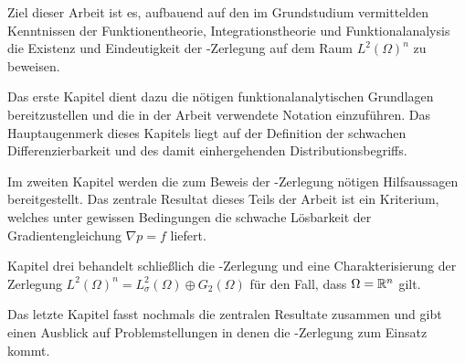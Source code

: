 Ziel dieser Arbeit ist es, aufbauend auf den im Grundstudium vermittelden Kenntnissen der Funktionentheorie, Integrationstheorie und Funktionalanalysis die Existenz und Eindeutigkeit der \helmholtz\hyp{}Zerlegung auf dem Raum $L^2(\Omega)^n$ zu beweisen.

Das erste Kapitel dient dazu die nötigen funktionalanalytischen Grundlagen bereitzustellen und die in der Arbeit verwendete Notation einzuführen.
Das Hauptaugenmerk dieses Kapitels liegt auf der Definition der schwachen Differenzierbarkeit und des damit einhergehenden Distributionsbegriffs.

Im zweiten Kapitel werden die zum Beweis der \helmholtz\hyp{}Zerlegung nötigen Hilfsaussagen bereitgestellt.
Das zentrale Resultat dieses Teils der Arbeit ist ein Kriterium, welches unter gewissen Bedingungen die schwache Lösbarkeit der Gradientengleichung $\nabla p = f$ liefert.

Kapitel drei behandelt schließlich die \helmholtz\hyp{}Zerlegung und eine Charakterisierung der Zerlegung $L^2(\Omega)^n = L^2_\sigma(\Omega) \oplus G_2(\Omega)$ für den Fall, dass $\Omega = \mathbb{R}^n$ gilt.

Das letzte Kapitel fasst nochmals die zentralen Resultate zusammen und gibt einen Ausblick auf Problemstellungen in denen die \helmholtz\hyp{}Zerlegung zum Einsatz kommt.
